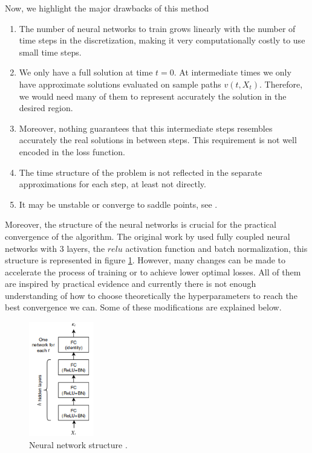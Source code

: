 Now, we highlight the major drawbacks of this method 
\begin{enumerate}
	\item The number of neural networks to train grows linearly with the number of time steps in the discretization, making it very computationally costly to use small time steps.
	\item We only have a full solution at time $t=0$. At intermediate times we only have approximate solutions evaluated on sample paths $v(t,X_t)$. Therefore, we would need many of them to represent accurately the solution in the desired region.
	\item Moreover, nothing guarantees that this intermediate steps resembles accurately the real solutions in between steps. This requirement is not well encoded in the loss function.
	\item The time structure of the problem is not reflected in the separate approximations for each step, at least not directly.
	\item It may be unstable or converge to saddle points, see \cite{hure_deep_2020}.
\end{enumerate}     

Moreover, the structure of the neural networks is crucial for the practical convergence of the algorithm. The original work by \cite{han_solving_2018} used fully coupled neural networks with 3 layers, the $relu$ activation function and batch normalization, this structure is represented in figure \ref{fig:FCStructure}. However, many changes can be made to accelerate the process of training or to achieve lower optimal losses. All of them are inspired by practical evidence and currently there is not enough understanding of how to choose theoretically the hyperparameters to reach the best convergence we can. Some of these modifications are explained below.

\begin{figure}[H]
	\centering
	\includegraphics[width=0.4\linewidth,height=5cm]{images/FCStructure}
	\caption{Neural network structure \cite{chan-wai-nam_machine_2018}.}
	\label{fig:FCStructure}
\end{figure}

